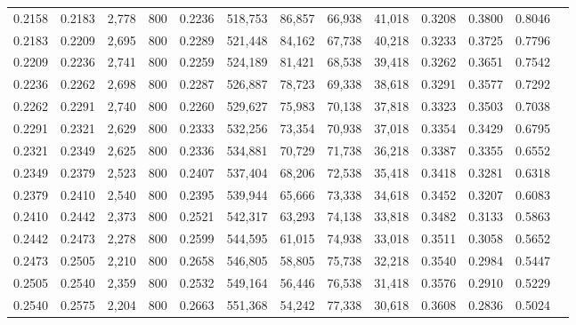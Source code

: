 \begin{tabular}{rrrrrrrrrrrrr}
0.2158 & 0.2183 &  2,778 & 800 &                                     0.2236 & 518,753 &  86,857 &  66,938 &  41,018 & 0.3208 & 0.3800 & 0.8046 \\
0.2183 & 0.2209 &  2,695 & 800 &                                     0.2289 & 521,448 &  84,162 &  67,738 &  40,218 & 0.3233 & 0.3725 & 0.7796 \\
0.2209 & 0.2236 &  2,741 & 800 &                                     0.2259 & 524,189 &  81,421 &  68,538 &  39,418 & 0.3262 & 0.3651 & 0.7542 \\
0.2236 & 0.2262 &  2,698 & 800 &                                     0.2287 & 526,887 &  78,723 &  69,338 &  38,618 & 0.3291 & 0.3577 & 0.7292 \\
0.2262 & 0.2291 &  2,740 & 800 &                                     0.2260 & 529,627 &  75,983 &  70,138 &  37,818 & 0.3323 & 0.3503 & 0.7038 \\
0.2291 & 0.2321 &  2,629 & 800 &                                     0.2333 & 532,256 &  73,354 &  70,938 &  37,018 & 0.3354 & 0.3429 & 0.6795 \\
0.2321 & 0.2349 &  2,625 & 800 &                                     0.2336 & 534,881 &  70,729 &  71,738 &  36,218 & 0.3387 & 0.3355 & 0.6552 \\
0.2349 & 0.2379 &  2,523 & 800 &                                     0.2407 & 537,404 &  68,206 &  72,538 &  35,418 & 0.3418 & 0.3281 & 0.6318 \\
0.2379 & 0.2410 &  2,540 & 800 &                                     0.2395 & 539,944 &  65,666 &  73,338 &  34,618 & 0.3452 & 0.3207 & 0.6083 \\
0.2410 & 0.2442 &  2,373 & 800 &                                     0.2521 & 542,317 &  63,293 &  74,138 &  33,818 & 0.3482 & 0.3133 & 0.5863 \\
0.2442 & 0.2473 &  2,278 & 800 &                                     0.2599 & 544,595 &  61,015 &  74,938 &  33,018 & 0.3511 & 0.3058 & 0.5652 \\
0.2473 & 0.2505 &  2,210 & 800 &                                     0.2658 & 546,805 &  58,805 &  75,738 &  32,218 & 0.3540 & 0.2984 & 0.5447 \\
0.2505 & 0.2540 &  2,359 & 800 &                                     0.2532 & 549,164 &  56,446 &  76,538 &  31,418 & 0.3576 & 0.2910 & 0.5229 \\
0.2540 & 0.2575 &  2,204 & 800 &                                     0.2663 & 551,368 &  54,242 &  77,338 &  30,618 & 0.3608 & 0.2836 & 0.5024 \\

\end{tabular}
